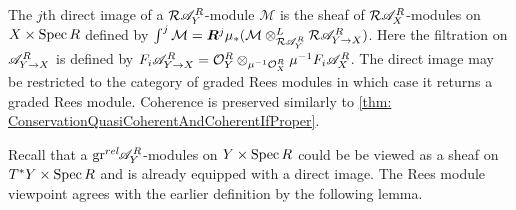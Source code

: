 The $j$th direct image of a $\mathcal{R}\mathscr{A}_Y^R$-module $\mathcal{M}$ is the sheaf of $\mathcal{R}\mathscr{A}_X^R$-modules on $X\times\operatorname{Spec} R$ defined by $\int^j \mathcal{M} = \boldsymbol{R}^j\mu_*(\mathcal{M}\otimes^L_{\mathcal{R} \mathscr{A}_Y^R} \mathcal{R} \mathscr{A}_{Y\to X}^R)$.
Here the filtration on $\mathscr{A}_{Y\to X}^R$ is defined by $F_i\mathscr{A}_{Y\to X}^R =\mathcal{O}_{Y}^R \otimes_{\mu^{-1}\mathcal{O}_X^R}\mu^{-1}F_i\mathscr{A}_X^R $.
The direct image may be restricted to the category of graded Rees modules in which case it returns a graded Rees module. Coherence is preserved similarly to \cref{thm: ConservationQuasiCoherentAndCoherentIfProper}.

Recall that a $\operatorname{gr}^{rel}\mkern-5mu\mathscr{A}_Y^R$-modules on $Y\times \operatorname{Spec} R$ could be be viewed as a sheaf on $T^*Y\times \operatorname{Spec} R$ and is already equipped with a direct image.
The Rees module viewpoint agrees with the earlier definition by the following lemma.


